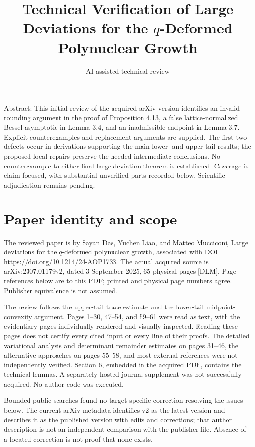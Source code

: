 \documentclass[10pt]{article}
\title{Technical Verification of
Large Deviations for the \(q\)-Deformed Polynuclear Growth}
\author{AI-assisted technical review}
\date{}
\begin{document}
\maketitle
Abstract: This initial review of the acquired arXiv version identifies an invalid rounding argument in the proof of Proposition 4.13, a false lattice-normalized Bessel asymptotic in Lemma 3.4, and an inadmissible endpoint in Lemma 3.7. Explicit counterexamples and replacement arguments are supplied. The first two defects occur in derivations supporting the main lower- and upper-tail results; the proposed local repairs preserve the needed intermediate conclusions. No counterexample to either final large-deviation theorem is established. Coverage is claim-focused, with substantial unverified parts recorded below. Scientific adjudication remains pending.\par
\section*{Paper identity and scope}
The reviewed paper is by Sayan Das, Yuchen Liao, and Matteo Mucciconi, Large deviations for the \(q\)-deformed polynuclear growth, associated with DOI https://doi.org/10.1214/24-AOP1733. The actual acquired source is arXiv:2307.01179v2, dated 3 September 2025, 65 physical pages [DLM]. Page references below are to this PDF; printed and physical page numbers agree. Publisher equivalence is not assumed.\par
The review follows the upper-tail trace estimate and the lower-tail midpoint-convexity argument. Pages 1–30, 47–54, and 59–61 were read as text, with the evidentiary pages individually rendered and visually inspected. Reading these pages does not certify every cited input or every line of their proofs. The detailed variational analysis and determinant remainder estimates on pages 31–46, the alternative approaches on pages 55–58, and most external references were not independently verified. Section 6, embedded in the acquired PDF, contains the technical lemmas. A separately hosted journal supplement was not successfully acquired. No author code was executed.\par
Bounded public searches found no target-specific correction resolving the issues below. The current arXiv metadata identifies v2 as the latest version and describes it as the published version with edits and corrections; that author description is not an independent comparison with the publisher file. Absence of a located correction is not proof that none exists.\par
\end{document}

